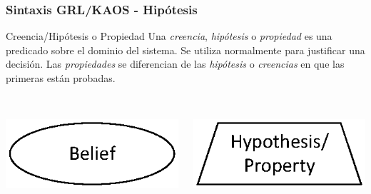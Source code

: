 \documentclass[slidestop,xcolor=pst,dvips,blue]{beamer}
\begin{document}
\begin{frame}[c]
    \frametitle{Sintaxis GRL/KAOS - Hipótesis}
    \begin{block}{Creencia/Hipótesis o Propiedad}
        Una \alert{\emph{creencia}}, \alert{\emph{hipótesis}} o \alert{\emph{propiedad}} es una predicado sobre el dominio del sistema. Se utiliza normalmente para justificar una decisión. Las \emph{propiedades} se diferencian de las \emph{hipótesis} o \emph{creencias} en que las primeras están probadas.
        \ \\
        \ \\
        \begin{columns}[c]
            \begin{column}{0.50\linewidth}
                \centering \includegraphics[width=0.5\columnwidth,keepaspectratio=true]{images/objetivos/belief(GRL).eps}
            \end{column}
            \begin{column}{0.50\linewidth}
                \centering \includegraphics[width=0.5\columnwidth,keepaspectratio=true]{images/objetivos/hypothesis(KAOS).eps}
            \end{column}
        \end{columns}
    \end{block}
\end{frame}
\end{document}
